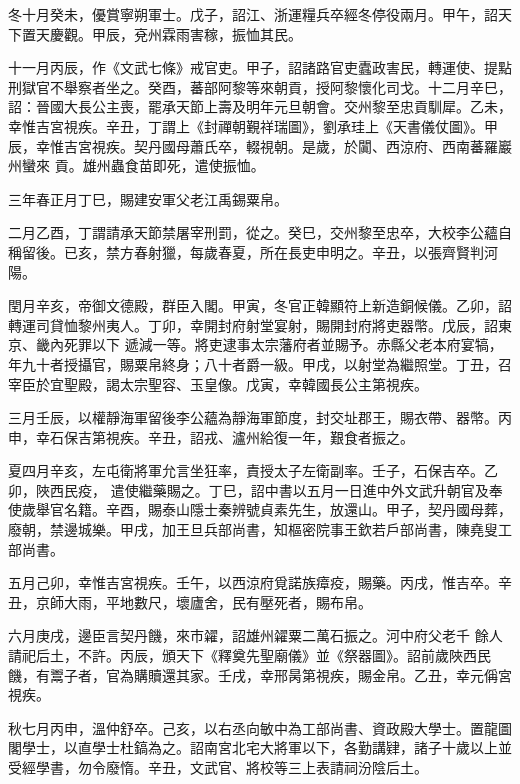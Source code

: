 \begin{pinyinscope}
 冬十月癸未，優賞寧朔軍士。戊子，詔江、浙運糧兵卒經冬停役兩月。甲午，詔天
 下置天慶觀。甲辰，兗州霖雨害稼，振恤其民。



 十一月丙辰，作《文武七條》戒官吏。甲子，詔諸路官吏蠹政害民，轉運使、提點刑獄官不舉察者坐之。癸酉，蕃部阿黎等來朝貢，授阿黎懷化司戈。十二月辛巳，詔：晉國大長公主喪，罷承天節上壽及明年元旦朝會。交州黎至忠貢馴犀。乙未，幸惟吉宮視疾。辛丑，丁謂上《封禪朝覲祥瑞圖》，劉承珪上《天書儀仗圖》。甲辰，幸惟吉宮視疾。契丹國母蕭氏卒，輟視朝。是歲，於闐、西涼府、西南蕃羅巖州蠻來
 貢。雄州蟲食苗即死，遣使振恤。



 三年春正月丁巳，賜建安軍父老江禹錫粟帛。



 二月乙酉，丁謂請承天節禁屠宰刑罰，從之。癸巳，交州黎至忠卒，大校李公蘊自稱留後。已亥，禁方春射獵，每歲春夏，所在長吏申明之。辛丑，以張齊賢判河陽。



 閏月辛亥，帝御文德殿，群臣入閣。甲寅，冬官正韓顯符上新造銅候儀。乙卯，詔轉運司貸恤黎州夷人。丁卯，幸開封府射堂宴射，賜開封府將吏器幣。戊辰，詔東京、畿內死罪以下
 遞減一等。將吏逮事太宗藩府者並賜予。赤縣父老本府宴犒，年九十者授攝官，賜粟帛終身；八十者爵一級。甲戌，以射堂為繼照堂。丁丑，召宰臣於宜聖殿，謁太宗聖容、玉皇像。戊寅，幸韓國長公主第視疾。



 三月壬辰，以權靜海軍留後李公蘊為靜海軍節度，封交址郡王，賜衣帶、器幣。丙申，幸石保吉第視疾。辛丑，詔戎、瀘州給復一年，艱食者振之。



 夏四月辛亥，左屯衛將軍允言坐狂率，責授太子左衛副率。壬子，石保吉卒。乙卯，陜西民疫，
 遣使繼藥賜之。丁巳，詔中書以五月一日進中外文武升朝官及奉使歲舉官名籍。辛酉，賜泰山隱士秦辨號貞素先生，放還山。甲子，契丹國母葬，廢朝，禁邊城樂。甲戌，加王旦兵部尚書，知樞密院事王欽若戶部尚書，陳堯叟工部尚書。



 五月己卯，幸惟吉宮視疾。壬午，以西涼府覓諾族瘴疫，賜藥。丙戌，惟吉卒。辛丑，京師大雨，平地數尺，壞廬舍，民有壓死者，賜布帛。



 六月庚戌，邊臣言契丹饑，來市糴，詔雄州糴粟二萬石振之。河中府父老千
 餘人請祀后土，不許。丙辰，頒天下《釋奠先聖廟儀》並《祭器圖》。詔前歲陜西民饑，有鬻子者，官為購贖還其家。壬戌，幸邢昺第視疾，賜金帛。乙丑，幸元偁宮視疾。



 秋七月丙申，溫仲舒卒。己亥，以右丞向敏中為工部尚書、資政殿大學士。置龍圖閣學士，以直學士杜鎬為之。詔南宮北宅大將軍以下，各勤講肄，諸子十歲以上並受經學書，勿令廢惰。辛丑，文武官、將校等三上表請祠汾陰后土。




\end{pinyinscope}
